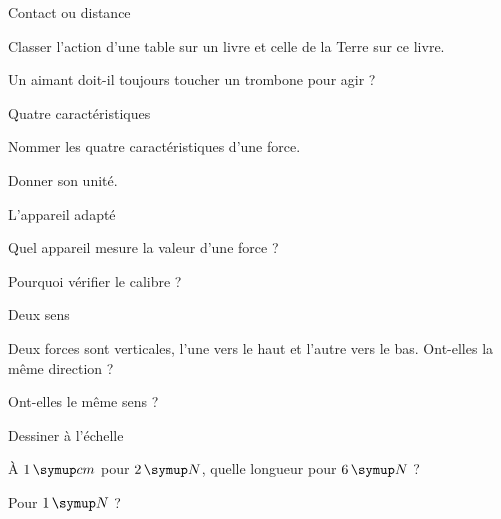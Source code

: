 \par\noindent\begin{minipage}{\linewidth}
\begin{exercice}[1]{Contact ou distance}
\begin{questions}
\item Classer l’action d’une table sur un livre et celle de la Terre sur ce livre.
\item Un aimant doit-il toujours toucher un trombone pour agir ?
\end{questions}
\end{exercice}
\end{minipage}
\par\noindent\begin{minipage}{\linewidth}
\begin{exercice}[1]{Quatre caractéristiques}
\begin{questions}
\item Nommer les quatre caractéristiques d’une force.
\item Donner son unité.
\end{questions}
\end{exercice}
\end{minipage}
\par\noindent\begin{minipage}{\linewidth}
\begin{exercice}[1]{L’appareil adapté}
\begin{questions}
\item Quel appareil mesure la valeur d’une force ?
\item Pourquoi vérifier le calibre ?
\end{questions}
\end{exercice}
\end{minipage}
\par\noindent\begin{minipage}{\linewidth}
\begin{exercice}[1]{Deux sens}
\begin{questions}
\item Deux forces sont verticales, l’une vers le haut et l’autre vers le bas. Ont-elles la même direction ?
\item Ont-elles le même sens ?
\end{questions}
\end{exercice}
\end{minipage}
\clearpage{}
\par\noindent\begin{minipage}{\linewidth}
\begin{exercice}[2]{Dessiner à l’échelle}
\begin{questions}
\item À $1\unite{cm}$ pour $2\unite N$, quelle longueur pour $6\unite N$ ?
\item Pour $1\unite N$ ?
\end{questions}
\end{exercice}
\end{minipage}
